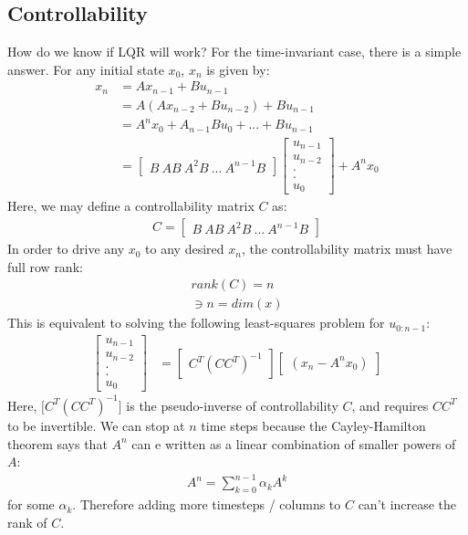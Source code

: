 \subsection{Controllability}
How do we know if LQR will work? For the time-invariant case, there is a simple answer. For any initial state $x_0$, $x_n$ is given by: 
\begin{align}
    x_n &= A x_{n-1} + B u_{n-1} \\
    &= A (Ax_{n-2} + B u_{n-2}) + B u_{n-1} \\
    &= A^n x_0 + A_{n-1} B u_0 + ... + B u_{n-1}\\
    &= \begin{bmatrix}
        B \ AB \ A^2 B \ ... \ A^{n-1} B 
    \end{bmatrix} 
    \begin{bmatrix}
        u_{n-1} \\
        u_{n-2} \\
        . \\
        . \\
        u_0
    \end{bmatrix}
    + 
    A^n x_0
\end{align}
Here, we may define a controllability matrix $C$ as: 
\begin{align}
    C = \begin{bmatrix}
        B \ AB \ A^2 B \ ... \ A^{n-1} B 
    \end{bmatrix} 
\end{align}
In order to drive any $x_0$ to any desired $x_n$, the controllability matrix must have full row rank: 
\begin{align}
    rank(C) = n \\
    \ni n = dim(x)
\end{align}
This is equivalent to solving the following least-squares problem for $u_{0:n-1}$: 
\begin{align}
    \begin{bmatrix}
        u_{n-1} \\
        u_{n-2} \\
        . \\
        . \\
        u_0
    \end{bmatrix}
    &= 
    \begin{bmatrix}
        C^T (C C^T)^{-1} 
    \end{bmatrix}
    \begin{bmatrix}
        (x_n - A^n x_0)
    \end{bmatrix}
\end{align}
Here, $\big[ C^T (C C^T)^{-1} \big]$ is the pseudo-inverse of controllability $C$, and requires $C C^T$ to be invertible. 
We can stop at $n$ time steps because the Cayley-Hamilton theorem says that $A^n$ can e written as a linear combination of smaller powers of $A$: 
\begin{align}
    A^n = \sum_{k=0}^{n-1} \alpha_k A^k 
\end{align}
for some $\alpha_k$.
Therefore adding more timesteps / columns to $C$ can't increase the rank of $C$. 